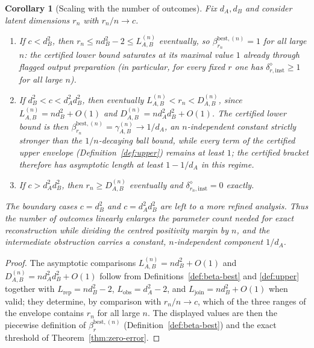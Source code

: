 \documentclass[11pt,a4paper]{article}
\newtheorem{corollary}[theorem]{Corollary}
\begin{document}
\begin{corollary}[Scaling with the number of outcomes]
\label{cor:scaling}
Fix $d_A,d_B$ and consider latent dimensions $r_n$ with $r_n/n\to c$.
\begin{enumerate}[leftmargin=*,itemsep=2pt]
\item If $c<d_B^2$, then $r_n\le nd_B^2-2\le L_{A,B}^{(n)}$ eventually, so $\beta_{r_n}^{\mathrm{best},(n)}=1$ for all large $n$: the certified lower bound saturates at its maximal value $1$ already through flagged output preparation (in particular, for every fixed $r$ one has $\delta_{r,\mathrm{inst}}^{\diamond}\ge1$ for all large $n$).
\item If $d_B^2<c<d_A^2d_B^2$, then eventually $L_{A,B}^{(n)}<r_n<D_{A,B}^{(n)}$, since $L_{A,B}^{(n)}=nd_B^2+O(1)$ and $D_{A,B}^{(n)}=nd_A^2d_B^2+O(1)$. The certified lower bound is then $\beta_{r_n}^{\mathrm{best},(n)}=\gamma_{A,B}^{(n)}\to1/d_A$, an $n$-independent constant strictly stronger than the $1/n$-decaying ball bound, while every term of the certified upper envelope (Definition~\ref{def:upper}) remains at least $1$; the certified bracket therefore has asymptotic length at least $1-1/d_A$ in this regime.
\item If $c>d_A^2d_B^2$, then $r_n\ge D_{A,B}^{(n)}$ eventually and $\delta_{r_n,\mathrm{inst}}^{\diamond}=0$ exactly.
\end{enumerate}
The boundary cases $c=d_B^2$ and $c=d_A^2d_B^2$ are left to a more refined analysis. Thus the number of outcomes linearly enlarges the parameter count needed for exact reconstruction while dividing the centred positivity margin by $n$, and the intermediate obstruction carries a constant, $n$-independent component $1/d_A$.
\end{corollary}

\begin{proof}
The asymptotic comparisons $L_{A,B}^{(n)}=nd_B^2+O(1)$ and $D_{A,B}^{(n)}=nd_A^2d_B^2+O(1)$ follow from Definitions~\ref{def:beta-best} and \ref{def:upper} together with $L_{\mathrm{rep}}=nd_B^2-2$, $L_{\mathrm{obs}}=d_A^2-2$, and $L_{\mathrm{join}}=nd_B^2+O(1)$ when valid; they determine, by comparison with $r_n/n\to c$, which of the three ranges of the envelope contains $r_n$ for all large $n$. The displayed values are then the piecewise definition of $\beta_r^{\mathrm{best},(n)}$ (Definition~\ref{def:beta-best}) and the exact threshold of Theorem~\ref{thm:zero-error}.
\end{proof}
\end{document}
